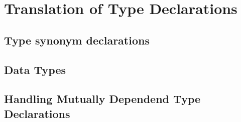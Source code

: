 \section{Translation of Type Declarations} \label{sec:translation:type-decl}

\subsection{Type synonym declarations}
\subsection{Data Types}
\subsection{Handling Mutually Dependend Type Declarations}
